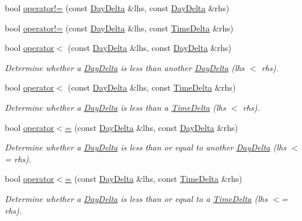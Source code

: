 \begin{DoxyCompactItemize}
bool \hyperlink{structDayDelta_ad0581c91724489d68bd79382831a5a1e}{operator!=} (const \hyperlink{structDayDelta}{Day\-Delta} \&lhs, const \hyperlink{structDayDelta}{Day\-Delta} \&rhs)
\item 
bool \hyperlink{structDayDelta_a5fe844795f3526eadc10b0ca22d889fb}{operator!=} (const \hyperlink{structDayDelta}{Day\-Delta} \&lhs, const \hyperlink{structTimeDelta}{Time\-Delta} \&rhs)
\item 
bool \hyperlink{structDayDelta_ad6792531d3979ec77fd7ddce40a1a496}{operator$<$} (const \hyperlink{structDayDelta}{Day\-Delta} \&lhs, const \hyperlink{structDayDelta}{Day\-Delta} \&rhs)
\begin{DoxyCompactList}\small\item\em Determine whether a \hyperlink{structDayDelta}{Day\-Delta} is less than another \hyperlink{structDayDelta}{Day\-Delta} (lhs $<$ rhs). \end{DoxyCompactList}\item 
bool \hyperlink{structDayDelta_ac674837a6effc9bebb565eb50342dd1e}{operator$<$} (const \hyperlink{structDayDelta}{Day\-Delta} \&lhs, const \hyperlink{structTimeDelta}{Time\-Delta} \&rhs)
\begin{DoxyCompactList}\small\item\em Determine whether a \hyperlink{structDayDelta}{Day\-Delta} is less than a \hyperlink{structTimeDelta}{Time\-Delta} (lhs $<$ rhs). \end{DoxyCompactList}\item 
bool \hyperlink{structDayDelta_abdcc1adeaad32dd0ae90569e52f514dd}{operator$<$=} (const \hyperlink{structDayDelta}{Day\-Delta} \&lhs, const \hyperlink{structDayDelta}{Day\-Delta} \&rhs)
\begin{DoxyCompactList}\small\item\em Determine whether a \hyperlink{structDayDelta}{Day\-Delta} is less than or equal to another \hyperlink{structDayDelta}{Day\-Delta} (lhs $<$= rhs). \end{DoxyCompactList}\item 
bool \hyperlink{structDayDelta_a28af6f5ba5523f346f0f4e48933a3957}{operator$<$=} (const \hyperlink{structDayDelta}{Day\-Delta} \&lhs, const \hyperlink{structTimeDelta}{Time\-Delta} \&rhs)
\begin{DoxyCompactList}\small\item\em Determine whether a \hyperlink{structDayDelta}{Day\-Delta} is less than or equal to a \hyperlink{structTimeDelta}{Time\-Delta} (lhs $<$= rhs). \end{DoxyCompactList}\item 

\end{DoxyCompactItemize}

